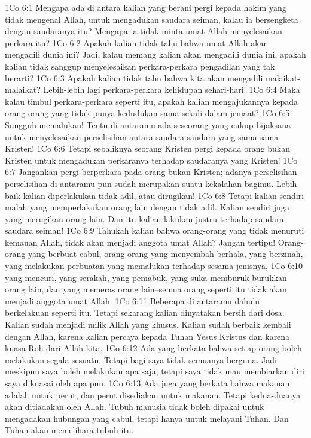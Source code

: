 1Co 6:1  Mengapa ada di antara kalian yang berani pergi kepada hakim yang tidak mengenal Allah, untuk mengadukan saudara seiman, kalau ia bersengketa dengan saudaranya itu? Mengapa ia tidak minta umat Allah menyelesaikan perkara itu?
1Co 6:2  Apakah kalian tidak tahu bahwa umat Allah akan mengadili dunia ini? Jadi, kalau memang kalian akan mengadili dunia ini, apakah kalian tidak sanggup menyelesaikan perkara-perkara pengadilan yang tak berarti?
1Co 6:3  Apakah kalian tidak tahu bahwa kita akan mengadili malaikat-malaikat? Lebih-lebih lagi perkara-perkara kehidupan sehari-hari!
1Co 6:4  Maka kalau timbul perkara-perkara seperti itu, apakah kalian mengajukannya kepada orang-orang yang tidak punya kedudukan sama sekali dalam jemaat?
1Co 6:5  Sungguh memalukan! Tentu di antaramu ada seseorang yang cukup bijaksana untuk menyelesaikan perselisihan antara saudara-saudara yang sama-sama Kristen!
1Co 6:6  Tetapi sebaliknya seorang Kristen pergi kepada orang bukan Kristen untuk mengadukan perkaranya terhadap saudaranya yang Kristen!
1Co 6:7  Jangankan pergi berperkara pada orang bukan Kristen; adanya perselisihan-perselisihan di antaramu pun sudah merupakan suatu kekalahan bagimu. Lebih baik kalian diperlakukan tidak adil, atau dirugikan!
1Co 6:8  Tetapi kalian sendiri malah yang memperlakukan orang lain dengan tidak adil. Kalian sendiri juga yang merugikan orang lain. Dan itu kalian lakukan justru terhadap saudara-saudara seiman!
1Co 6:9  Tahukah kalian bahwa orang-orang yang tidak menuruti kemauan Allah, tidak akan menjadi anggota umat Allah? Jangan tertipu! Orang-orang yang berbuat cabul, orang-orang yang menyembah berhala, yang berzinah, yang melakukan perbuatan yang memalukan terhadap sesama jenisnya,
1Co 6:10  yang mencuri, yang serakah, yang pemabuk, yang suka memburuk-burukkan orang lain, dan yang memeras orang lain--semua orang seperti itu tidak akan menjadi anggota umat Allah.
1Co 6:11  Beberapa di antaramu dahulu berkelakuan seperti itu. Tetapi sekarang kalian dinyatakan bersih dari dosa. Kalian sudah menjadi milik Allah yang khusus. Kalian sudah berbaik kembali dengan Allah, karena kalian percaya kepada Tuhan Yesus Kristus dan karena kuasa Roh dari Allah kita.
1Co 6:12  Ada yang berkata bahwa setiap orang boleh melakukan segala sesuatu. Tetapi bagi saya tidak semuanya berguna. Jadi meskipun saya boleh melakukan apa saja, tetapi saya tidak mau membiarkan diri saya dikuasai oleh apa pun.
1Co 6:13  Ada juga yang berkata bahwa makanan adalah untuk perut, dan perut disediakan untuk makanan. Tetapi kedua-duanya akan ditiadakan oleh Allah. Tubuh manusia tidak boleh dipakai untuk mengadakan hubungan yang cabul, tetapi hanya untuk melayani Tuhan. Dan Tuhan akan memelihara tubuh itu.
